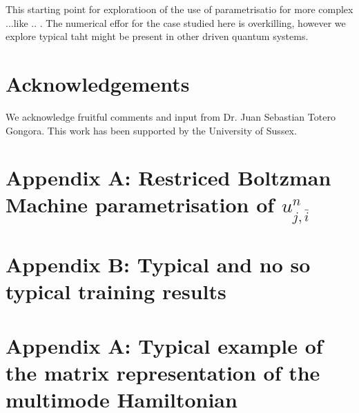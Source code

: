 \documentclass[pra,twocolumn,showkeys,preprintnumbers, amsmath,amssymb, aps,A4paper]{revtex4-1}
\begin{document}
This starting point for exploratioon of the use of parametrisatio for more complex ...like .. .  The numerical effor for the case studied here is overkilling, however we explore typical taht might be present in other driven quantum systems. 






\section*{Acknowledgements}
We acknowledge fruitful comments and input from Dr. Juan Sebastian Totero Gongora. This work has been supported by the University of Sussex.

\section*{Appendix A: Restriced Boltzman Machine parametrisation of $u^n_{j,\bar{i}}$}
\section*{Appendix B: Typical and no so typical training results}
\section*{Appendix A: Typical example of the matrix representation of the multimode Hamiltonian}
\end{document}
